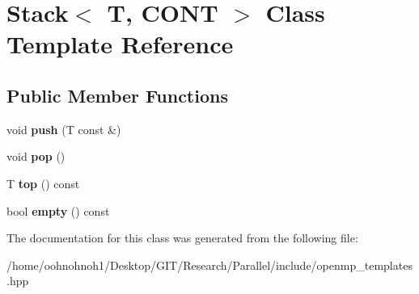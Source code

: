 \hypertarget{classStack}{}\section{Stack$<$ T, C\+O\+NT $>$ Class Template Reference}
\label{classStack}
\subsection*{Public Member Functions}
\begin{DoxyCompactItemize}
\item 
\mbox{\label{classStack_aea229d8696966f0d8f47adcea1ab5273}} 
void {\bfseries push} (T const \&)
\item 
\mbox{\label{classStack_a51935a0e68262d77c8b4568bba1025fe}} 
void {\bfseries pop} ()
\item 
\mbox{\label{classStack_a190f2b6a0821fdc5428b65d4dcd21a92}} 
T {\bfseries top} () const
\item 
\mbox{\label{classStack_a915e28dc0405c75bc38c55957c808ad4}} 
bool {\bfseries empty} () const
\end{DoxyCompactItemize}


The documentation for this class was generated from the following file\+:\begin{DoxyCompactItemize}
\item 
/home/oohnohnoh1/\+Desktop/\+G\+I\+T/\+Research/\+Parallel/include/openmp\+\_\+templates.\+hpp\end{DoxyCompactItemize}
